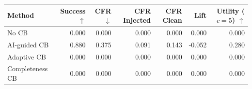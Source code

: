 \begin{tabular}{lrrrrrr}
\toprule
Method & Success $\uparrow$ & CFR $\downarrow$ & CFR Injected & CFR Clean & Lift & Utility ($c=5$) $\uparrow$ \\
\midrule
No CB & 0.000 & 0.000 & 0.000 & 0.000 & 0.000 & 0.000 \\
AI-guided CB & 0.880 & 0.375 & 0.091 & 0.143 & -0.052 & 0.280 \\
Adaptive CB & 0.000 & 0.000 & 0.000 & 0.000 & 0.000 & 0.000 \\
Completeness CB & 0.000 & 0.000 & 0.000 & 0.000 & 0.000 & 0.000 \\
\bottomrule
\end{tabular}
